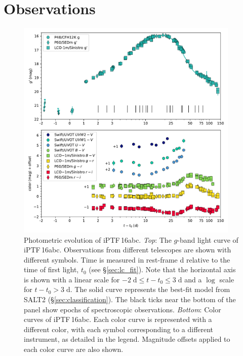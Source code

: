 \documentclass[twocolumn]{aastex61}
\newcommand{\abc}{iPTF\,16abc}
\begin{document}
\section{Observations}
\label{sec:obs}

\begin{figure}[htb]
  \centering
  \includegraphics[width=0.95\textwidth]{logLC_with_colors.pdf}
  \caption{Photometric evolution of \abc. \textit{Top}: The $g$-band
  light curve of \abc. Observations from different 
  telescopes are shown with different symbols. Time is measured in 
  rest-frame d relative to the time of first light, $t_0$ (see 
  \S\ref{sec:lc_fit}). Note that the horizontal axis is shown with a linear scale 
  for $-2 \; \mathrm{d} \le t - t_0 \le 3 \; \mathrm{d}$ and a 
  $\log$ scale for $t - t_0 > 3 \; \mathrm{d}$. The solid curve 
  represents the best-fit model from SALT2 
  (\S\ref{sec:classification}). The black ticks near the
  bottom of the panel show epochs of spectroscopic observations.
  \textit{Bottom}: Color curves of \abc. Each color curve is 
  represented with a different color, with each symbol corresponding 
  to a different instrument, as detailed in the legend. Magnitude 
  offsets applied to each color curve are also shown.
  }
  \label{fig:lightcurve}
\end{figure}
\end{document}

